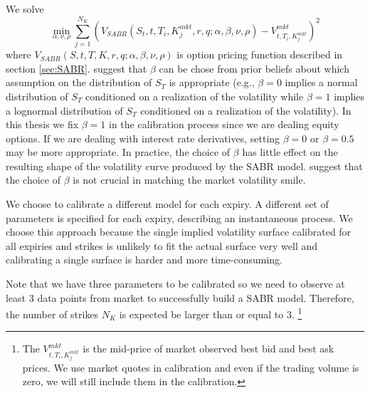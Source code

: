 \documentclass[letterpaper,12pt,titlepage,oneside,final]{book}
\numberwithin{equation}{section}
\theoremstyle{definition}
\newcommand{\Vmkt}{V^{mkt}}
\begin{document}
 We solve
\[
\min_{\alpha,\nu,\rho} \sum_{j=1}^{N_K} \left(V_{SABR}(S_t,t,T_i,K^{mkt}_j,r,q;\alpha,\beta,\nu,\rho)-\Vmkt_{t,T_i,K^{mkt}_j}\right)^2
\]
where $V_{SABR}(S,t,T,K,r,q;\alpha,\beta,\nu,\rho)$ is option pricing function described in section \ref{sec:SABR}.  \citet{hagan2002managing} suggest that $\beta$ can be chose from prior beliefs about which assumption on the distribution of $S_T$  is appropriate (e.g., $\beta=0$ implies a normal distribution of $S_T$ conditioned on a realization of the volatility while $\beta=1$ implies a lognormal distribution of $S_T$ conditioned on a realization of the volatility).   In this thesis we fix $\beta=1$ in the calibration process since we are dealing equity options. If we are dealing with interest rate derivatives, setting $\beta=0$ or $\beta=0.5$ may be more appropriate. In practice, the choice of $\beta$ has little effect on the resulting shape of the volatility curve produced by the SABR model. \citet{hagan2002managing} suggest that the choice of $\beta$ is not crucial in matching the market volatility smile. 

We choose to calibrate a different model for each expiry. A different set of parameters is specified for each expiry, describing an instantaneous process.  We choose this approach because the single implied volatility surface calibrated for all expiries and strikes is unlikely to fit the actual surface very well and calibrating a single surface is harder and more time-consuming. 

Note that we have three parameters to be calibrated so we need to observe at least 3 data points from market to successfully build a SABR model. Therefore, the number of strikes $N_K$ is expected be larger than or equal to 3. \footnote{The $\Vmkt_{t,T_i,K^{mkt}_j}$ is the mid-price of market observed best bid and  best ask prices. We use market quotes in calibration and even if the trading volume is zero, we will still include them in the calibration.}
\end{document}
